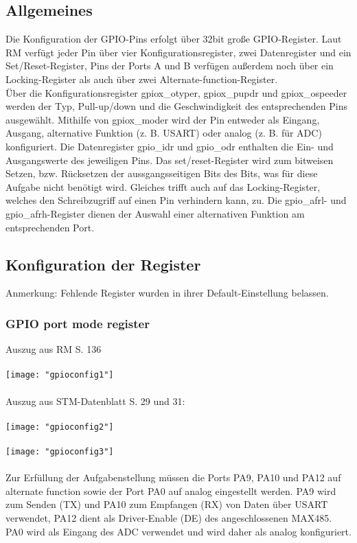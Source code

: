\documentclass[11pt]{report}
\begin{document}
		\subsection{Allgemeines}
			Die Konfiguration der GPIO-Pins erfolgt über 32bit große GPIO-Register. Laut RM verfügt jeder Pin über vier Konfigurationsregister, zwei Datenregister und ein Set/Reset-Register, Pins der Ports A und B verfügen außerdem noch über ein Locking-Register als auch über zwei Alternate-function-Register.\\
			Über die Konfigurationsregister gpiox\_otyper, gpiox\_pupdr und gpiox\_ospeeder werden der Typ, Pull-up/down und die Geschwindigkeit des entsprechenden Pins ausgewählt. Mithilfe von gpiox\_moder wird der Pin entweder als Eingang, Ausgang, alternative Funktion (z. B. USART) oder analog (z. B. für ADC) konfiguriert. Die Datenregister gpio\_idr und gpio\_odr enthalten die Ein- und Ausgangswerte des jeweiligen Pins. Das set/reset-Register wird zum bitweisen Setzen, bzw. Rücksetzen der aussgangsseitigen Bits des Bits, was für diese Aufgabe nicht benötigt wird. Gleiches trifft auch auf das Locking-Register, welches den Schreibzugriff auf einen Pin verhindern kann, zu. Die gpio\_afrl- und gpio\_afrh-Register dienen der Auswahl einer alternativen Funktion am entsprechenden Port.
		\subsection{Konfiguration der Register}
			Anmerkung: Fehlende Register wurden in ihrer Default-Einstellung belassen.
			\subsubsection{GPIO port mode register}
				Auszug aus RM S. 136\\
				\\\texttt{[image: "gpioconfig1"]}\\
				\\Auszug aus STM-Datenblatt S. 29 und 31:\\
				\\\texttt{[image: "gpioconfig2"]}\\
				\\\texttt{[image: "gpioconfig3"]}\\
				\\Zur Erfüllung der Aufgabenstellung müssen die Ports PA9, PA10 und PA12 auf alternate function sowie der Port PA0 auf analog eingestellt werden. PA9 wird zum Senden (TX) und PA10 zum Empfangen (RX) von Daten über USART verwendet, PA12 dient als Driver-Enable (DE) des angeschlossenen MAX485. PA0 wird als Eingang des ADC verwendet und wird daher als analog konfiguriert.
\end{document}
